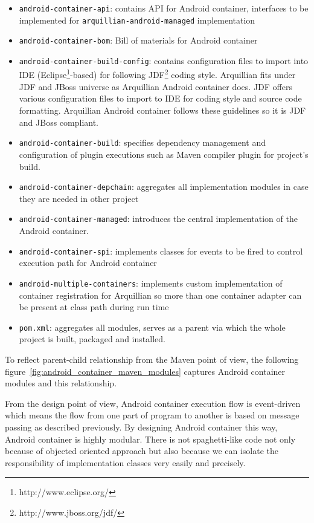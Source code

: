 \documentclass[12pt,final,oneside]{fithesis}
\begin{document}
\begin{itemize}
	\item{\texttt{android-container-api}: contains API for Android container, interfaces to be implemented for \texttt{arquillian-android-managed} implementation}
	\item{\texttt{android-container-bom}: Bill of materials for Android container}
	\item{\texttt{android-container-build-config}: contains configuration files to import into IDE (Eclipse\footnote{http://www.eclipse.org/}-based) for following JDF\footnote{http://www.jboss.org/jdf/} coding style. Arquillian fits under JDF and JBoss universe as Arquillian Android container does. JDF offers various configuration files to import to IDE for coding style and source code formatting. Arquillian Android container follows these guidelines so it is JDF and JBoss compliant.}
	\item{\texttt{android-container-build}: specifies dependency management and configuration of plugin executions such as Maven compiler plugin for project's build.}
	\item{\texttt{android-container-depchain}: aggregates all implementation modules in case they are needed in other project}
	\item{\texttt{android-container-managed}: introduces the central implementation of the Android container.}
	\item{\texttt{android-container-spi}: implements classes for events to be fired to control execution path for Android container}
	\item{\texttt{android-multiple-containers}: implements custom implementation of container registration for Arquillian so more than one container adapter can be present at class path during run time}
	\item{\texttt{pom.xml}: aggregates all modules, serves as a parent via which the whole project is built, packaged and installed.}
\end{itemize}

To reflect parent-child relationship from the Maven point of view, the following figure~\ref{fig:android_container_maven_modules} captures Android container modules and this relationship.

From the design point of view, Android container execution flow is event-driven which means the flow from one part of program to another is based on message passing as described previously. By designing Android container this way, Android container is highly modular. There is not spaghetti-like code not only because of objected oriented approach but also because we can isolate the responsibility of implementation classes very easily and precisely.
\end{document}
